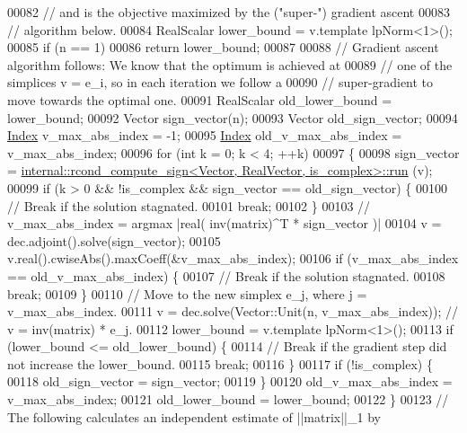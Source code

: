 \begin{DoxyCode}
00082   \textcolor{comment}{// and is the objective maximized by the ("super-") gradient ascent}
00083   \textcolor{comment}{// algorithm below.}
00084   RealScalar lower\_bound = v.template lpNorm<1>();
00085   \textcolor{keywordflow}{if} (n == 1)
00086     \textcolor{keywordflow}{return} lower\_bound;
00087 
00088   \textcolor{comment}{// Gradient ascent algorithm follows: We know that the optimum is achieved at}
00089   \textcolor{comment}{// one of the simplices v = e\_i, so in each iteration we follow a}
00090   \textcolor{comment}{// super-gradient to move towards the optimal one.}
00091   RealScalar old\_lower\_bound = lower\_bound;
00092   Vector sign\_vector(n);
00093   Vector old\_sign\_vector;
00094   \hyperlink{namespace_eigen_a62e77e0933482dafde8fe197d9a2cfde}{Index} v\_max\_abs\_index = -1;
00095   \hyperlink{namespace_eigen_a62e77e0933482dafde8fe197d9a2cfde}{Index} old\_v\_max\_abs\_index = v\_max\_abs\_index;
00096   \textcolor{keywordflow}{for} (\textcolor{keywordtype}{int} k = 0; k < 4; ++k)
00097   \{
00098     sign\_vector = 
      \hyperlink{struct_eigen_1_1internal_1_1rcond__compute__sign}{internal::rcond\_compute\_sign<Vector, RealVector, is\_complex>::run}
      (v);
00099     \textcolor{keywordflow}{if} (k > 0 && !is\_complex && sign\_vector == old\_sign\_vector) \{
00100       \textcolor{comment}{// Break if the solution stagnated.}
00101       \textcolor{keywordflow}{break};
00102     \}
00103     \textcolor{comment}{// v\_max\_abs\_index = argmax |real( inv(matrix)^T * sign\_vector )|}
00104     v = dec.adjoint().solve(sign\_vector);
00105     v.real().cwiseAbs().maxCoeff(&v\_max\_abs\_index);
00106     \textcolor{keywordflow}{if} (v\_max\_abs\_index == old\_v\_max\_abs\_index) \{
00107       \textcolor{comment}{// Break if the solution stagnated.}
00108       \textcolor{keywordflow}{break};
00109     \}
00110     \textcolor{comment}{// Move to the new simplex e\_j, where j = v\_max\_abs\_index.}
00111     v = dec.solve(Vector::Unit(n, v\_max\_abs\_index));  \textcolor{comment}{// v = inv(matrix) * e\_j.}
00112     lower\_bound = v.template lpNorm<1>();
00113     \textcolor{keywordflow}{if} (lower\_bound <= old\_lower\_bound) \{
00114       \textcolor{comment}{// Break if the gradient step did not increase the lower\_bound.}
00115       \textcolor{keywordflow}{break};
00116     \}
00117     \textcolor{keywordflow}{if} (!is\_complex) \{
00118       old\_sign\_vector = sign\_vector;
00119     \}
00120     old\_v\_max\_abs\_index = v\_max\_abs\_index;
00121     old\_lower\_bound = lower\_bound;
00122   \}
00123   \textcolor{comment}{// The following calculates an independent estimate of ||matrix||\_1 by}

\end{DoxyCode}
